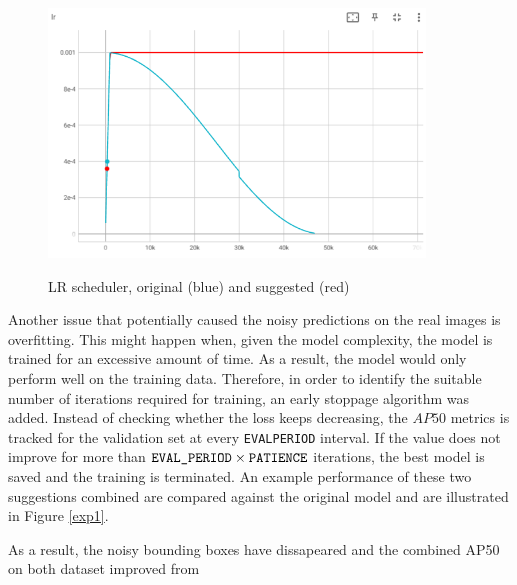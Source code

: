 \documentclass[english, 12pt, a4paper, elec, utf8, a-1b, online]{aaltothesis}
\begin{document}
\begin{figure}[htb]
	\begin{center}
		\includegraphics[width=10cm]{./lr.png}
	\end{center}
	\caption{LR scheduler, original (blue) and suggested (red)}
	\begin{center}
		\label{lr}
	\end{center}
\end{figure}
\FloatBarrier

Another issue that potentially caused the noisy predictions on the real images is overfitting. This might happen when, given the model complexity, the model is trained for an excessive amount of time. As a result, the model would only perform well on the training data. 
Therefore, in order to identify the suitable number of iterations required for training, an early stoppage algorithm was added. Instead of checking whether the loss keeps decreasing, the $AP50$ metrics is tracked for the validation set at every \texttt{EVAL\textunderscore PERIOD} interval. If the value does not improve for more than $\texttt{EVAL\textunderscore PERIOD} \times \texttt{PATIENCE}$ iterations, the best model is saved and the training is terminated. An example performance of these two suggestions combined are compared against the original model and are illustrated in Figure \ref{exp1}. 

As a result, the noisy bounding boxes have dissapeared and the combined AP50 on both dataset improved from 
\end{document}
